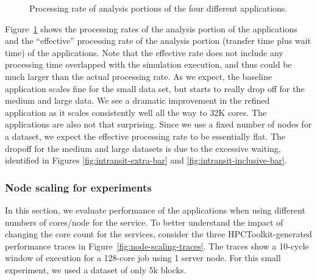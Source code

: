 \begin{figure}[htbp]
\begin{centering}
\vspace{-12pt}



\caption[Processing rate of analysis.]{Processing rate of analysis portions of
the four different applications.}
\label{fig:processing-rates}
\end{centering}
\end{figure}

Figure~\ref{fig:processing-rates} shows the processing rates of the
analysis portion of the \intransit applications and the ``effective''
processing rate of the analysis portion (transfer time plus wait time) of
the \intransit applications.  Note that the effective \intransit rate does
not include any processing time overlapped with the simulation execution,
and thus could be much larger than the actual processing rate.  As we
expect, the baseline application scales fine for the small data set, but
starts to really drop off for the medium and large data.  We see a dramatic
improvement in the \insitu refined application as it scales consistently
well all the way to 32K cores.  The \intransit applications are also not
that surprising.  Since we use a fixed number of nodes for a dataset, we
expect the effective processing rate to be essentially flat.  The dropoff
for the medium and large datasets is due to the excessive waiting,
identified in Figures \ref{fig:intransit-extra-bar} and
\ref{fig:intransit-inclusive-bar}.



\subsubsection{Node scaling for \intransit experiments}

In this section, we evaluate performance of the \intransit applications when
using different numbers of cores/node for the \intransit service.  To better
understand the impact of changing the core count for the services, consider the
three HPCToolkit-generated performance traces in
Figure~\ref{fig:node-scaling-traces}.  The traces show a 10-cycle window
of execution for a 128-core job using 1 server node. For this small experiment,
we used a dataset of only 5k blocks.

